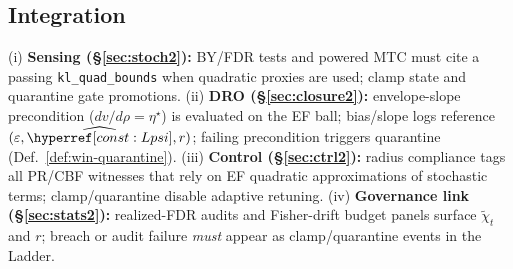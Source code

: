 \subsection*{Integration}
\noindent
(i) \textbf{Sensing (\S\ref{sec:stoch2}):} BY/FDR tests and powered MTC must cite a passing \texttt{kl\_quad\_bounds} when quadratic proxies are used; clamp state and quarantine gate promotions.
(ii) \textbf{DRO (\S\ref{sec:closure2}):} envelope-slope precondition (\(dv/d\rho=\eta^\star\)) is evaluated on the EF ball; bias/slope logs reference $(\varepsilon,\widehat{\constref{Lpsi}},r)$; failing precondition triggers quarantine (Def.~\ref{def:win-quarantine}).
(iii) \textbf{Control (\S\ref{sec:ctrl2}):} radius compliance tags all PR/CBF witnesses that rely on EF quadratic approximations of stochastic terms; clamp/quarantine disable adaptive retuning.
(iv) \textbf{Governance link (\S\ref{sec:stats2}):} realized-FDR audits and Fisher-drift budget panels surface $\tilde\chi_t$ and $r$; breach or audit failure \emph{must} appear as clamp/quarantine events in the Ladder.
